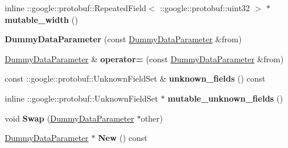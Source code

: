 \begin{DoxyCompactItemize}
\item 
\mbox{\label{classcaffe_1_1_dummy_data_parameter_a190f6eca7a955d32ce366352ff4c123f}} 
inline \+::google\+::protobuf\+::\+Repeated\+Field$<$ \+::google\+::protobuf\+::uint32 $>$ $\ast$ {\bfseries mutable\+\_\+width} ()
\item 
\mbox{\label{classcaffe_1_1_dummy_data_parameter_a2be424eda74d16c5018f4fe78a262e30}} 
{\bfseries Dummy\+Data\+Parameter} (const \mbox{\hyperlink{classcaffe_1_1_dummy_data_parameter}{Dummy\+Data\+Parameter}} \&from)
\item 
\mbox{\label{classcaffe_1_1_dummy_data_parameter_af3d429adc36816f3f61169c0aa925c2b}} 
\mbox{\hyperlink{classcaffe_1_1_dummy_data_parameter}{Dummy\+Data\+Parameter}} \& {\bfseries operator=} (const \mbox{\hyperlink{classcaffe_1_1_dummy_data_parameter}{Dummy\+Data\+Parameter}} \&from)
\item 
\mbox{\label{classcaffe_1_1_dummy_data_parameter_a7e45549811603a7ab345398353a0370a}} 
const \+::google\+::protobuf\+::\+Unknown\+Field\+Set \& {\bfseries unknown\+\_\+fields} () const
\item 
\mbox{\label{classcaffe_1_1_dummy_data_parameter_accacb957303140579464433aa5007498}} 
inline \+::google\+::protobuf\+::\+Unknown\+Field\+Set $\ast$ {\bfseries mutable\+\_\+unknown\+\_\+fields} ()
\item 
\mbox{\label{classcaffe_1_1_dummy_data_parameter_a2005d03860bbf052330512370b0fb544}} 
void {\bfseries Swap} (\mbox{\hyperlink{classcaffe_1_1_dummy_data_parameter}{Dummy\+Data\+Parameter}} $\ast$other)
\item 
\mbox{\label{classcaffe_1_1_dummy_data_parameter_a7cbc1b2caba5aae95035d6ebfaeae936}} 
\mbox{\hyperlink{classcaffe_1_1_dummy_data_parameter}{Dummy\+Data\+Parameter}} $\ast$ {\bfseries New} () const
\item 
\mbox{\label{classcaffe_1_1_dummy_data_parameter_a36b883d0fe094d421683da6fcc48a9da}} 

\end{DoxyCompactItemize}
